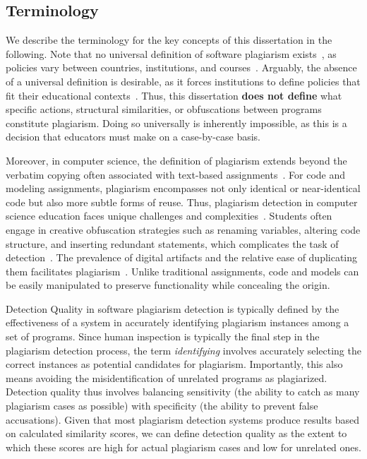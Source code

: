 \subsection{Terminology}\label{sec:foundations-terminology}
We describe the terminology for the key concepts of this dissertation in the following. Note that no universal definition of software plagiarism exists~\cite{Culwin2001}, as policies vary between countries, institutions, and courses~\cite{Simon2013, novak2023}. Arguably, the absence of a universal definition is desirable, as it forces institutions to define policies that fit their educational contexts~\cite{Simon2014b, Simon2016}.
Thus, this dissertation \textbf{does not define} what specific actions, structural similarities, or obfuscations between programs constitute plagiarism. Doing so universally is inherently impossible, as this is a decision that educators must make on a case-by-case basis.

Moreover, in computer science, the definition of plagiarism extends beyond the verbatim copying often associated with text-based assignments~\cite{Cosma2008}. For code and modeling assignments, plagiarism encompasses not only identical or near-identical code but also more subtle forms of reuse.
Thus, plagiarism detection in computer science education faces unique challenges and complexities~\cite{Cosma2008, Murray2010, Simon2016, Simon2013}. 
Students often engage in creative obfuscation strategies such as renaming variables, altering code structure, and inserting redundant statements, which complicates the task of detection~\cite{Novak2019, Karnalim2016}.
The prevalence of digital artifacts and the relative ease of duplicating them facilitates plagiarism~\cite{Kauffman2015}.
Unlike traditional assignments, code and models can be easily manipulated to preserve functionality while concealing the origin.

\begin{concept} Detection Quality in software plagiarism detection is typically defined by the effectiveness of a system in accurately identifying plagiarism instances among a set of programs.
    Since human inspection is typically the final step in the plagiarism detection process, the term \textit{identifying} involves accurately selecting the correct instances as potential candidates for plagiarism. Importantly, this also means avoiding the misidentification of unrelated programs as plagiarized. Detection quality thus involves balancing sensitivity (the ability to catch as many plagiarism cases as possible) with specificity (the ability to prevent false accusations). Given that most plagiarism detection systems produce results based on calculated similarity scores, we can define detection quality as the extent to which these scores are high for actual plagiarism cases and low for unrelated ones. 
\end{concept}

